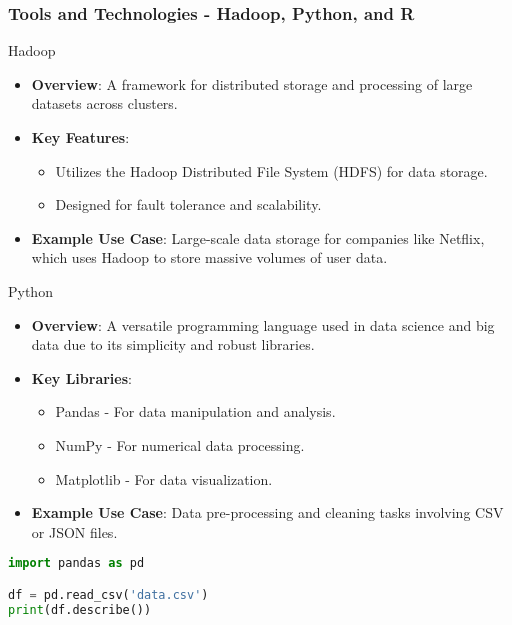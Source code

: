 \documentclass[aspectratio=169]{beamer}
\begin{document}
\begin{frame}[fragile]
    \frametitle{Tools and Technologies - Hadoop, Python, and R}
    \begin{block}{Hadoop}
        \begin{itemize}
            \item \textbf{Overview}: A framework for distributed storage and processing of large datasets across clusters.
            \item \textbf{Key Features}:
            \begin{itemize}
                \item Utilizes the Hadoop Distributed File System (HDFS) for data storage.
                \item Designed for fault tolerance and scalability.
            \end{itemize}
            \item \textbf{Example Use Case}: Large-scale data storage for companies like Netflix, which uses Hadoop to store massive volumes of user data.
        \end{itemize}
    \end{block}

    \begin{block}{Python}
        \begin{itemize}
            \item \textbf{Overview}: A versatile programming language used in data science and big data due to its simplicity and robust libraries.
            \item \textbf{Key Libraries}:
            \begin{itemize}
                \item Pandas - For data manipulation and analysis.
                \item NumPy - For numerical data processing.
                \item Matplotlib - For data visualization.
            \end{itemize}
            \item \textbf{Example Use Case}: Data pre-processing and cleaning tasks involving CSV or JSON files.
        \end{itemize}
    \end{block}
    \begin{lstlisting}[language=Python, basicstyle=\tiny]
import pandas as pd

df = pd.read_csv('data.csv')
print(df.describe())
    \end{lstlisting}
\end{frame}
\end{document}
